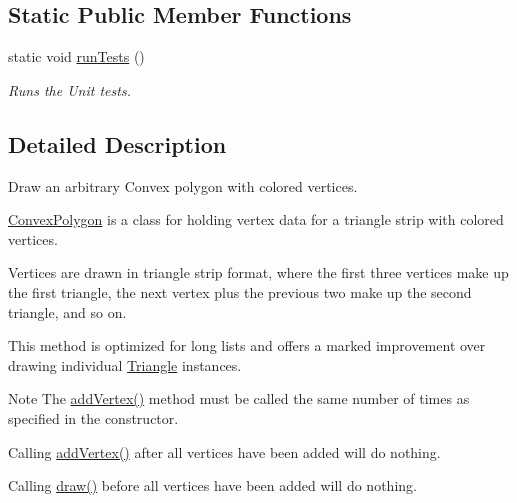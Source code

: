 \subsection*{\-Static \-Public \-Member \-Functions}
\begin{DoxyCompactItemize}
\item 
static void \hyperlink{classtsgl_1_1_convex_polygon_ac309bc2b2f142b0a02b9dc38e901daeb}{run\-Tests} ()
\begin{DoxyCompactList}\small\item\em \-Runs the \-Unit tests. \end{DoxyCompactList}\end{DoxyCompactItemize}


\subsection{\-Detailed \-Description}
\-Draw an arbitrary \-Convex polygon with colored vertices. 

\hyperlink{classtsgl_1_1_convex_polygon}{\-Convex\-Polygon} is a class for holding vertex data for a triangle strip with colored vertices.

\-Vertices are drawn in triangle strip format, where the first three vertices make up the first triangle, the next vertex plus the previous two make up the second triangle, and so on.

\-This method is optimized for long lists and offers a marked improvement over drawing individual \hyperlink{classtsgl_1_1_triangle}{\-Triangle} instances. \begin{DoxyNote}{\-Note}
\-The \hyperlink{classtsgl_1_1_convex_polygon_a60d17a5ac80a796d05dfeff855791cc0}{add\-Vertex()} method must be called the same number of times as specified in the constructor. 

\-Calling \hyperlink{classtsgl_1_1_convex_polygon_a60d17a5ac80a796d05dfeff855791cc0}{add\-Vertex()} after all vertices have been added will do nothing. 

\-Calling \hyperlink{classtsgl_1_1_convex_polygon_add4d4971a5d22385eebbfe771af916b5}{draw()} before all vertices have been added will do nothing. 
\end{DoxyNote}


